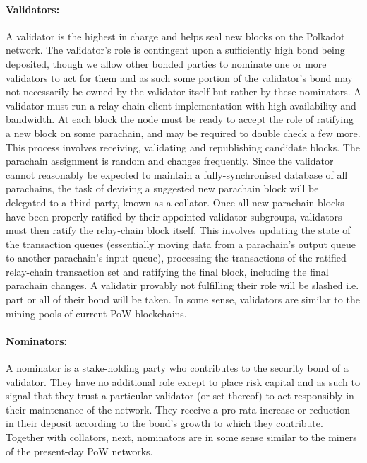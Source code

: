 \paragraph{Validators:}\label{par:validators} A validator is the highest in charge and helps seal new blocks on the Polkadot network. The validator’s role is contingent upon a sufficiently high bond being deposited, though we allow other bonded parties to nominate one or more validators to act for them and as such some portion of the validator’s bond may not necessarily be owned by the validator itself but rather by these nominators.
A validator must run a relay-chain client implementation with high availability and bandwidth. At each block the node must be ready to accept the role of ratifying a new block on some parachain, and may be required to double check a few more. This process involves receiving, validating and republishing candidate blocks. The parachain assignment is random and changes frequently. Since the validator cannot reasonably be expected to maintain a fully-synchronised database of all parachains, the task of devising a suggested new parachain block will be delegated to a third-party, known as a collator.
Once all new parachain blocks have been properly ratified by their appointed validator subgroups, validators must then ratify the relay-chain block itself. This involves updating the state of the transaction queues (essentially moving data from a parachain’s output queue to another parachain’s input queue), processing the transactions of the ratified relay-chain transaction set and ratifying the final block, including the final parachain changes.
A validatir provably not fulfilling their role will be slashed i.e. part or all of their bond will be taken.
In some sense, validators are similar to the mining pools of current PoW blockchains.

\paragraph{Nominators:}\label{par:nominators} A nominator is a stake-holding party who contributes to the security bond of a validator. They have no additional role except to place risk capital and as such to signal that they trust a particular validator (or set thereof) to act responsibly in their maintenance of the network. They receive a pro-rata increase or reduction in their deposit according to the bond’s growth to which they contribute. Together with collators, next, nominators are in some sense similar to the miners of the present-day PoW networks.

